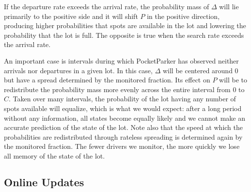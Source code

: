 If the departure rate exceeds the arrival rate, the probability mass of
$\Delta$ will lie primarily to the positive side and it will shift $P$ in the
positive direction, producing higher probabilities that spots are available
in the lot and lowering the probability that the lot is full. The opposite is
true when the search rate exceeds the arrival rate.

An important case is intervals during which PocketParker has observed neither
arrivals nor departures in a given lot. In this case, $\Delta$ will be
centered around $0$ but have a spread determined by the monitored fraction.
Its effect on $P$ will be to redistribute the probability mass more evenly
across the entire interval from $0$ to $C$. Taken over many intervals, the
probability of the lot having any number of spots available will equalize,
which is what we would expect: after a long period without any information,
all states become equally likely and we cannot make an accurate prediction of
the state of the lot. Note also that the speed at which the probabilities are
redistributed through rateless spreading is determined again by the monitored
fraction. The fewer drivers we monitor, the more quickly we lose all memory
of the state of the lot.

\subsection{Online Updates}

